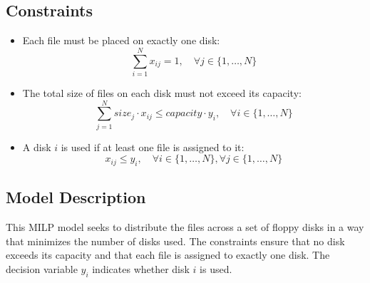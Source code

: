 \documentclass{article}
\begin{document}
\subsection*{Constraints}
\begin{itemize}
    \item Each file must be placed on exactly one disk:
    \[
    \sum_{i=1}^{N} x_{ij} = 1, \quad \forall j \in \{1, \ldots, N\}
    \]
    
    \item The total size of files on each disk must not exceed its capacity:
    \[
    \sum_{j=1}^{N} size_j \cdot x_{ij} \leq capacity \cdot y_i, \quad \forall i \in \{1, \ldots, N\}
    \]
    
    \item A disk $i$ is used if at least one file is assigned to it:
    \[
    x_{ij} \leq y_i, \quad \forall i \in \{1, \ldots, N\}, \forall j \in \{1, \ldots, N\}
    \]
\end{itemize}

\subsection*{Model Description}
This MILP model seeks to distribute the files across a set of floppy disks in a way that minimizes the number of disks used. The constraints ensure that no disk exceeds its capacity and that each file is assigned to exactly one disk. The decision variable $y_i$ indicates whether disk $i$ is used.
\end{document}
